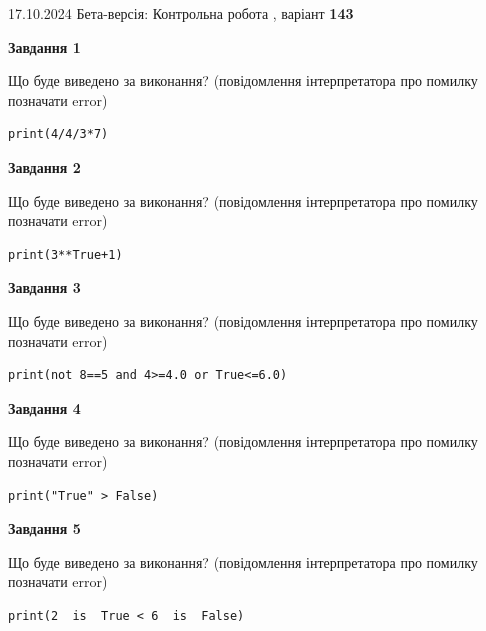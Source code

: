 \documentclass[12pt, ukrainian]{article}
\begin{document}
{\Large{17.10.2024 Бета-версія: Контрольна робота , варіант  \No \textbf { 143 }\par}}
{
\begin {large}
{\begin {center}\textbf{Завдання 1}\end {center}}

Що буде виведено за виконання? (повідомлення інтерпретатора про помилку позначати error)\par
\begin{verbatim}
print(4/4/3*7)
\end{verbatim}

{\begin {center}\textbf{Завдання 2}\end {center}}

Що буде виведено за виконання? (повідомлення інтерпретатора про помилку позначати error)\par
\begin{verbatim}
print(3**True+1)
\end{verbatim}

{\begin {center}\textbf{Завдання 3}\end {center}}

Що буде виведено за виконання? (повідомлення інтерпретатора про помилку позначати error)\par
\begin{verbatim}
print(not 8==5 and 4>=4.0 or True<=6.0)
\end{verbatim}

{\begin {center}\textbf{Завдання 4}\end {center}}

Що буде виведено за виконання? (повідомлення інтерпретатора про помилку позначати error)\par
\begin{verbatim}
print("True" > False)
\end{verbatim}

{\begin {center}\textbf{Завдання 5}\end {center}}

Що буде виведено за виконання? (повідомлення інтерпретатора про помилку позначати error)\par
\begin{verbatim}
print(2  is  True < 6  is  False)
\end{verbatim}


\end{large}}
\end{document}
